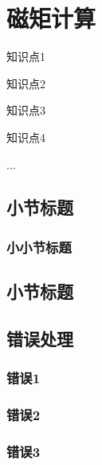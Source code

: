 \section{磁矩计算}\label{sec:磁矩计算}

\begin{Abstract}
    \item 知识点1
    \item 知识点2
    \item 知识点3
    \item 知识点4
    \item ...
\end{Abstract}


\subsection{小节标题}\label{subsec:节标题-小节标题}

\subsubsection{小小节标题}

\subsection{小节标题}\label{subsec:节标题-小节标题}


\subsection{错误处理}\label{subsec:节标题-错误处理}

\subsubsection{错误1}

\subsubsection{错误2}

\subsubsection{错误3}